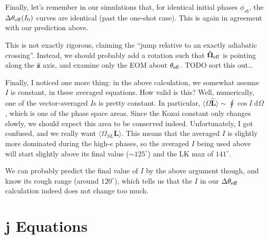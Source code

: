 \documentclass[11pt,
        usenames, %
        dvipsnames %
    ]{article}
\newcommand*{\bm}[1]{\boldsymbol{\mathbf{#1}}}
\newcommand*{\uv}[1]{\hat{\bm{#1}}}
\newcommand*{\ev}[1]{\langle#1\rangle}
\begin{document}
Finally, let's remember in our simulations that, for identical initial phases
$\phi_{sb}$, the $\Delta \theta_{\rm eff}(I_0)$ curves are identical (past the
one-shot case). This is again in agreement with our prediction above.

This is not exactly rigorous, claiming the ``jump relative to an exactly
adiabatic crossing''. Instead, we should probably add a rotation such that
$\uv{\Omega}_{\rm eff}$ is pointing along the $\uv{z}$ axis, and examine only
the EOM about $\theta_{\rm eff}$. TODO sort this out\dots

Finally, I noticed one more thing: in the above calculation, we somewhat assume
$I$ is constant, in these averaged equations. How valid is this? Well,
numerically, one of the vector-averaged $I$s is pretty constant. In particular,
$\ev{\dot{\Omega}\uv{L}} \sim \oint \cos I \;\mathrm{d}\Omega$, which is one of
the phase space areas. Since the Kozai constant only changes slowly, we should
expect this area to be conserved indeed. Unfortunately, I got confused, and we
really want $\ev{\Omega_{SL} \bm{L}}$. This means that the averaged $I$ is
slightly more dominated during the high-$e$ phases, so the averaged $I$ being
used above will start slightly above its final value ($\sim 125^\circ$) and the
LK max of $141^\circ$.

We can probably predict the final value of $I$ by the above argument though, and
know its rough range (around $120^\circ$), which tells us that the $I$ in our
$\Delta \theta_{\rm eff}$ calculation indeed does not change too much.

\subsection{}

\appendix

\section{$\bm{j}$ Equations}
\end{document}
